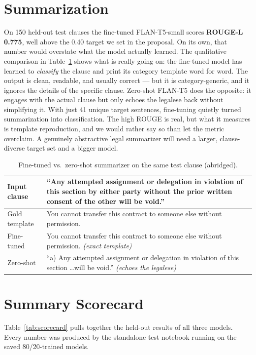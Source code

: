\section{Summarization}
On 150 held-out test clauses the fine-tuned FLAN-T5-small scores \textbf{ROUGE-L 0.775}, well above the 0.40 target we set in the proposal. On its own, that number would overstate what the model actually learned. The qualitative comparison in Table~\ref{tab:sumqual} shows what is really going on: the fine-tuned model has learned to \emph{classify} the clause and print its category template word for word. The output is clean, readable, and usually correct --- but it is category-generic, and it ignores the details of the specific clause. Zero-shot FLAN-T5 does the opposite: it engages with the actual clause but only echoes the legalese back without simplifying it. With just 41 unique target sentences, fine-tuning quietly turned summarization into classification. The high ROUGE is real, but what it measures is template reproduction, and we would rather say so than let the metric overclaim. A genuinely abstractive legal summarizer will need a larger, clause-diverse target set and a bigger model.

\begin{table}[ht]
\centering
\caption{Fine-tuned vs.\ zero-shot summarizer on the same test clause (abridged).}
\label{tab:sumqual}
\small
\begin{tabular}{p{3.2cm} p{10.3cm}}
\toprule
\textbf{Input clause} & ``Any attempted assignment or delegation in violation of this section by either party without the prior written consent of the other will be void.''\\
\midrule
Gold template & You cannot transfer this contract to someone else without permission.\\
Fine-tuned    & You cannot transfer this contract to someone else without permission. \emph{(exact template)}\\
Zero-shot     & ``a) Any attempted assignment or delegation in violation of this section \ldots will be void.'' \emph{(echoes the legalese)}\\
\bottomrule
\end{tabular}
\end{table}

\section{Summary Scorecard}
Table~\ref{tab:scorecard} pulls together the held-out results of all three models. Every number was produced by the standalone test notebook running on the saved 80/20-trained models.

